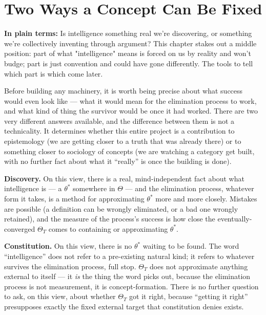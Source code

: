 \chapter{Two Ways a Concept Can Be Fixed}
\label{ch:two-ways}

\begin{plainlanguage}
\textbf{In plain terms:} Is intelligence something real we're discovering, or something we're collectively inventing through argument? This chapter stakes out a middle position: part of what "intelligence" means is forced on us by reality and won't budge; part is just convention and could have gone differently. The tools to tell which part is which come later.
\end{plainlanguage}

Before building any machinery, it is worth being precise about what success would even look like --- what it would mean for the elimination process to work, and what kind of thing the survivor would be once it had worked. There are two very different answers available, and the difference between them is not a technicality. It determines whether this entire project is a contribution to epistemology (we are getting closer to a truth that was already there) or to something closer to sociology of concepts (we are watching a category get built, with no further fact about what it ``really'' is once the building is done).

\textbf{Discovery.} On this view, there is a real, mind-independent fact about what intelligence is --- a $\theta^*$ somewhere in $\Theta$ --- and the elimination process, whatever form it takes, is a method for approximating $\theta^*$ more and more closely. Mistakes are possible (a definition can be wrongly eliminated, or a bad one wrongly retained), and the measure of the process's success is how close the eventually-converged $\Theta_T$ comes to containing or approximating $\theta^*$.

\textbf{Constitution.} On this view, there is no $\theta^*$ waiting to be found. The word ``intelligence'' does not refer to a pre-existing natural kind; it refers to whatever survives the elimination process, full stop. $\Theta_T$ does not approximate anything external to itself --- it \emph{is} the thing the word picks out, because the elimination process is not measurement, it is concept-formation. There is no further question to ask, on this view, about whether $\Theta_T$ got it right, because ``getting it right'' presupposes exactly the fixed external target that constitution denies exists.

